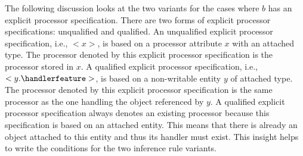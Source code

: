 The following discussion looks at the two variants for the cases where $b$ has an explicit processor specification. There are two forms of explicit processor specifications: unqualified and qualified. An unqualified explicit processor specification, i.e., $<x>$, is based on a processor attribute $x$ with an attached type. The processor denoted by this explicit processor specification is the processor stored in $x$. A qualified explicit processor specification, i.e., $<y.\handlerfeature>$, is based on a non-writable entity $y$ of attached type. The processor denoted by this explicit processor specification is the same processor as the one handling the object referenced by $y$. A qualified explicit processor specification always denotes an existing processor because this specification is based on an attached entity. This means that there is already an object attached to this entity and thus its handler must exist. This insight helps to write the conditions for the two inference rule variants.

